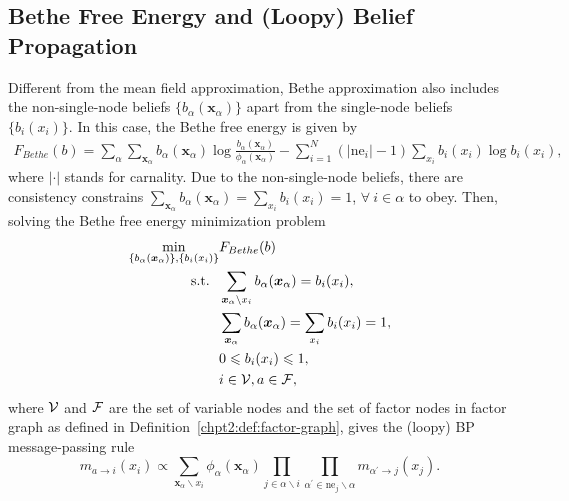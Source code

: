 \subsection{Bethe Free Energy and (Loopy) Belief Propagation}


Different from the mean field approximation, Bethe approximation also includes the non-single-node beliefs $\{b_{\alpha}(\bm{x}_{\alpha})\}$ apart from the single-node beliefs $\{b_i(x_i)\}$\cite{yedidia2003understanding}. In this case, the Bethe free energy is given by
\begin{align}\label{apdix:bethe-free-energy}
  F_{Bethe}(b) = \sum_{\alpha} \sum_{\bm{x}_{\alpha}}
                b_{\alpha}(\bm{x}_{\alpha})\log{\frac{b_{\alpha}(\bm{x}_{\alpha})}{\phi_{\alpha}(\bm{x}_{\alpha})}
                } -  \sum_{i=1}^{N} (|\mathrm{ne}_i| - 1) \sum_{x_i} b_i(x_i) \log{b_i(x_i)},
\end{align}
where $|\cdot|$ stands for carnality.
Due to the  non-single-node beliefs, there are consistency constrains $\sum_{\bm{x}_{\alpha}} b_{\alpha}(\bm{x}_{\alpha}) = \sum_{ x_i} b_i({x}_i) =1$, $\forall~ i \in \alpha$ to obey. Then, solving the Bethe free energy minimization problem
\begin{align}
  \min_{\{b_{\alpha}(\bm{x}_{\alpha})\}, \{b_i(x_i)\}}& F_{Bethe}(b) \nonumber \\
  \mathrm{s.t.}~~ & \sum_{\bm{x}_{\alpha} \backslash x_i} b_{\alpha}(\bm{x}_{\alpha})  =
                    b_i(x_i), \nonumber \\
                                                      & \sum_{\bm{x}_{\alpha}} b_{\alpha}(\bm{x}_{\alpha}) = \sum_{ x_i} b_i({x}_i) =1,
                                                        \nonumber \\
                                                      &  0 \leqslant b_i(x_i) \leqslant 1,  \nonumber \\
                                                      & i \in \mathcal{V} , a \in \mathcal{F},
\end{align}
where $\mathcal{V}$ and $\mathcal{F}$ are the set of variable nodes and the set of
factor nodes in factor graph as defined in
Definition~\ref{chpt2:def:factor-graph}, gives the (loopy) BP message-passing rule
\begin{equation}
  m_{a\rightarrow i}(x_i) \propto \sum_{\bm{x}_{\alpha} \backslash x_i}
  \phi_{\alpha}(\bm{x}_{\alpha}) \prod_{j \in \alpha \backslash i} \prod_{\alpha^{\prime} \in \mathrm{ne}_j
    \backslash \alpha} m_{\alpha^{\prime}\rightarrow j}(x_j).
\end{equation}


